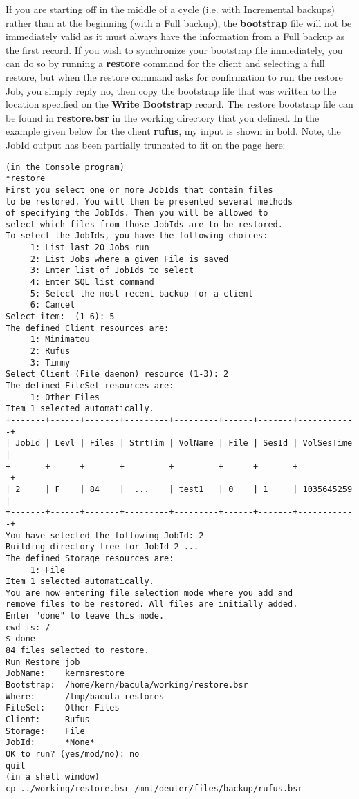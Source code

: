 If you are starting off in the middle of a cycle (i.e. with Incremental
backups) rather than at the beginning (with a Full backup), the {\bf
bootstrap} file will not be immediately valid as it must always have the
information from a Full backup as the first record. If you wish to synchronize
your bootstrap file immediately, you can do so by running a {\bf restore}
command for the client and selecting a full restore, but when the restore
command asks for confirmation to run the restore Job, you simply reply no,
then copy the bootstrap file that was written to the location specified on the
{\bf Write Bootstrap} record. The restore bootstrap file can be found in {\bf
restore.bsr} in the working directory that you defined. In the example given
below for the client {\bf rufus}, my input is shown in bold. Note, the JobId
output has been partially truncated to fit on the page here:

\footnotesize
\begin{verbatim}
(in the Console program)
*restore
First you select one or more JobIds that contain files
to be restored. You will then be presented several methods
of specifying the JobIds. Then you will be allowed to
select which files from those JobIds are to be restored.
To select the JobIds, you have the following choices:
     1: List last 20 Jobs run
     2: List Jobs where a given File is saved
     3: Enter list of JobIds to select
     4: Enter SQL list command
     5: Select the most recent backup for a client
     6: Cancel
Select item:  (1-6): 5
The defined Client resources are:
     1: Minimatou
     2: Rufus
     3: Timmy
Select Client (File daemon) resource (1-3): 2
The defined FileSet resources are:
     1: Other Files
Item 1 selected automatically.
+-------+------+-------+---------+---------+------+-------+------------+
| JobId | Levl | Files | StrtTim | VolName | File | SesId | VolSesTime |
+-------+------+-------+---------+---------+------+-------+------------+
| 2     | F    | 84    |  ...    | test1   | 0    | 1     | 1035645259 |
+-------+------+-------+---------+---------+------+-------+------------+
You have selected the following JobId: 2
Building directory tree for JobId 2 ...
The defined Storage resources are:
     1: File
Item 1 selected automatically.
You are now entering file selection mode where you add and
remove files to be restored. All files are initially added.
Enter "done" to leave this mode.
cwd is: /
$ done
84 files selected to restore.
Run Restore job
JobName:    kernsrestore
Bootstrap:  /home/kern/bacula/working/restore.bsr
Where:      /tmp/bacula-restores
FileSet:    Other Files
Client:     Rufus
Storage:    File
JobId:      *None*
OK to run? (yes/mod/no): no
quit
(in a shell window)
cp ../working/restore.bsr /mnt/deuter/files/backup/rufus.bsr
\end{verbatim}
\normalsize


